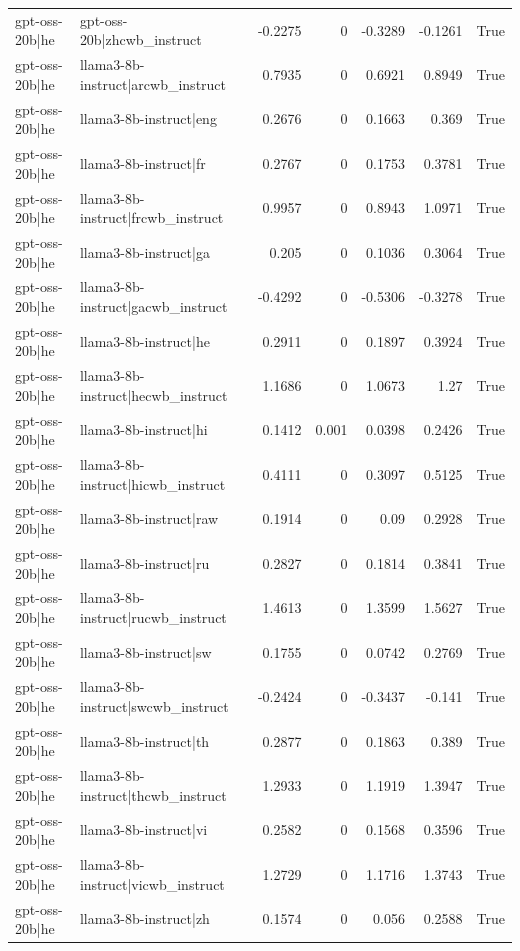 \begin{table}
\begin{tabular}{l l r r r r l}
gpt-oss-20b|he & gpt-oss-20b|zhcwb_instruct & -0.2275 & 0 & -0.3289 & -0.1261 & True \\
gpt-oss-20b|he & llama3-8b-instruct|arcwb_instruct & 0.7935 & 0 & 0.6921 & 0.8949 & True \\
gpt-oss-20b|he & llama3-8b-instruct|eng & 0.2676 & 0 & 0.1663 & 0.369 & True \\
gpt-oss-20b|he & llama3-8b-instruct|fr & 0.2767 & 0 & 0.1753 & 0.3781 & True \\
gpt-oss-20b|he & llama3-8b-instruct|frcwb_instruct & 0.9957 & 0 & 0.8943 & 1.0971 & True \\
gpt-oss-20b|he & llama3-8b-instruct|ga & 0.205 & 0 & 0.1036 & 0.3064 & True \\
gpt-oss-20b|he & llama3-8b-instruct|gacwb_instruct & -0.4292 & 0 & -0.5306 & -0.3278 & True \\
gpt-oss-20b|he & llama3-8b-instruct|he & 0.2911 & 0 & 0.1897 & 0.3924 & True \\
gpt-oss-20b|he & llama3-8b-instruct|hecwb_instruct & 1.1686 & 0 & 1.0673 & 1.27 & True \\
gpt-oss-20b|he & llama3-8b-instruct|hi & 0.1412 & 0.001 & 0.0398 & 0.2426 & True \\
gpt-oss-20b|he & llama3-8b-instruct|hicwb_instruct & 0.4111 & 0 & 0.3097 & 0.5125 & True \\
gpt-oss-20b|he & llama3-8b-instruct|raw & 0.1914 & 0 & 0.09 & 0.2928 & True \\
gpt-oss-20b|he & llama3-8b-instruct|ru & 0.2827 & 0 & 0.1814 & 0.3841 & True \\
gpt-oss-20b|he & llama3-8b-instruct|rucwb_instruct & 1.4613 & 0 & 1.3599 & 1.5627 & True \\
gpt-oss-20b|he & llama3-8b-instruct|sw & 0.1755 & 0 & 0.0742 & 0.2769 & True \\
gpt-oss-20b|he & llama3-8b-instruct|swcwb_instruct & -0.2424 & 0 & -0.3437 & -0.141 & True \\
gpt-oss-20b|he & llama3-8b-instruct|th & 0.2877 & 0 & 0.1863 & 0.389 & True \\
gpt-oss-20b|he & llama3-8b-instruct|thcwb_instruct & 1.2933 & 0 & 1.1919 & 1.3947 & True \\
gpt-oss-20b|he & llama3-8b-instruct|vi & 0.2582 & 0 & 0.1568 & 0.3596 & True \\
gpt-oss-20b|he & llama3-8b-instruct|vicwb_instruct & 1.2729 & 0 & 1.1716 & 1.3743 & True \\
gpt-oss-20b|he & llama3-8b-instruct|zh & 0.1574 & 0 & 0.056 & 0.2588 & True \\

\end{tabular}
\end{table}
